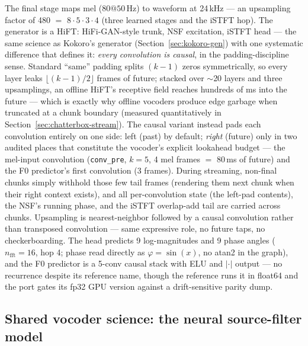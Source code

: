\documentclass[11pt,a4paper]{article}
\newcommand{\code}[1]{\texttt{#1}}
\begin{document}
The final stage maps mel ($80@50$\,Hz) to waveform at 24\,kHz --- an upsampling factor
of 480 $=$ $8 \cdot 5 \cdot 3 \cdot 4$ (three learned stages and the iSTFT hop). The
generator is a HiFT: HiFi-GAN-style trunk, NSF excitation, iSTFT head --- the same
science as Kokoro's generator (Section~\ref{sec:kokoro-gen}) with one systematic
difference that defines it: \emph{every convolution is causal}, in the padding-discipline
sense. Standard ``same'' padding splits $(k-1)$ zeros symmetrically, so every layer
leaks $\lfloor (k{-}1)/2 \rfloor$ frames of future; stacked over $\sim$20 layers and
three upsamplings, an offline HiFT's receptive field reaches hundreds of ms into the
future --- which is exactly why offline vocoders produce edge garbage when truncated at
a chunk boundary (measured quantitatively in Section~\ref{sec:chatterbox-stream}). The
causal variant instead pads each convolution entirely on one side:
left (past) by default; \emph{right} (future) only in two audited places that
constitute the vocoder's explicit lookahead budget --- the mel-input convolution
(\code{conv\_pre}, $k{=}5$, 4 mel frames $=$ 80\,ms of future) and the F0 predictor's
first convolution (3 frames). During streaming, non-final chunks simply withhold those
few tail frames (rendering them next chunk when their right context exists), and all
per-convolution state (the left-pad contents), the NSF's running phase, and the iSTFT
overlap-add tail are carried across chunks. Upsampling is nearest-neighbor followed by a
causal convolution rather than transposed convolution --- same expressive role, no
future taps, no checkerboarding. The head predicts 9 log-magnitudes and 9 phase angles
($n_{\mathrm{fft}} = 16$, hop 4; phase read directly as $\varphi = \sin(x)$, no atan2 in
the graph), and the F0 predictor is a 5-conv causal stack with ELU and $|\cdot|$ output
--- no recurrence despite its reference name, though the reference runs it in float64
and the port gates its fp32 GPU version against a drift-sensitive parity dump.

\subsection{Shared vocoder science: the neural source-filter model}
\label{sec:nsf}
\end{document}
